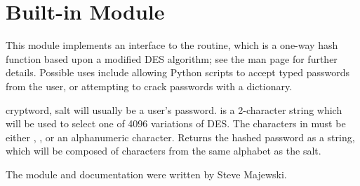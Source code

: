 \section{Built-in Module }
\label{module-crypt}

This module implements an interface to the  routine,
which is a one-way hash function based upon a modified DES algorithm;
see the \UNIX{} man page for further details.  Possible uses include
allowing Python scripts to accept typed passwords from the user, or
attempting to crack \UNIX{} passwords with a dictionary.

\begin{funcdesc}{crypt}{word, salt} 
 will usually be a user's password.   is a
2-character string which will be used to select one of 4096 variations
of DES.  The characters in  must be
either , \code{/}, or an alphanumeric character.  Returns the
hashed password as a string, which will be composed of characters from
the same alphabet as the salt.
\end{funcdesc}

The module and documentation were written by Steve Majewski.
